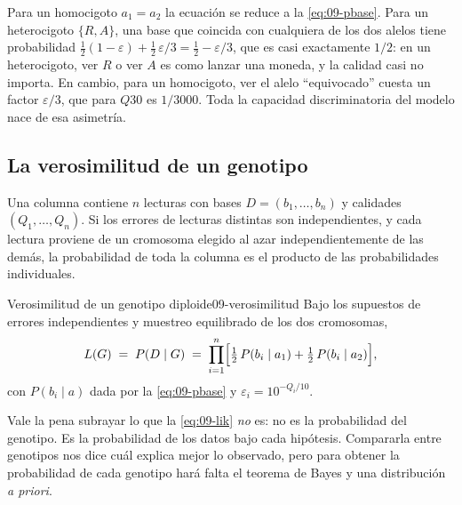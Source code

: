 Para un homocigoto $a_1=a_2$ la ecuación se reduce a la \cref{eq:09-pbase}. Para un heterocigoto $\{R,A\}$, una base que coincida con cualquiera de los dos alelos tiene probabilidad $\tfrac12(1-\varepsilon)+\tfrac12\,\varepsilon/3 = \tfrac12 - \varepsilon/3$, que es casi exactamente $1/2$: en un heterocigoto, ver $R$ o ver $A$ es como lanzar una moneda, y la calidad casi no importa. En cambio, para un homocigoto, ver el alelo ``equivocado'' cuesta un factor $\varepsilon/3$, que para $Q30$ es $1/3000$. Toda la capacidad discriminatoria del modelo nace de esa asimetría.

\subsection{La verosimilitud de un genotipo}

Una columna contiene $n$ lecturas con bases $D=(b_1,\dots,b_n)$ y calidades $(Q_1,\dots,Q_n)$. Si los errores de lecturas distintas son independientes, y cada lectura proviene de un cromosoma elegido al azar independientemente de las demás, la probabilidad de toda la columna es el producto de las probabilidades individuales.

\begin{teorema}{Verosimilitud de un genotipo diploide}{09-verosimilitud}
Bajo los supuestos de errores independientes y muestreo equilibrado de los dos cromosomas,
\begin{equation}\label{eq:09-lik}
L(G) \;=\; P(D \mid G) \;=\; \prod_{i=1}^{n}\Bigl[\tfrac12\,P(b_i\mid a_1) + \tfrac12\,P(b_i\mid a_2)\Bigr],
\end{equation}
con $P(b_i\mid a)$ dada por la \cref{eq:09-pbase} y $\varepsilon_i=10^{-Q_i/10}$.
\end{teorema}

\begin{simbolos}
\end{simbolos}

Vale la pena subrayar lo que la \cref{eq:09-lik} \emph{no} es: no es la probabilidad del genotipo. Es la probabilidad de los datos bajo cada hipótesis. Compararla entre genotipos nos dice cuál explica mejor lo observado, pero para obtener la probabilidad de cada genotipo hará falta el teorema de Bayes y una distribución \emph{a priori}.

